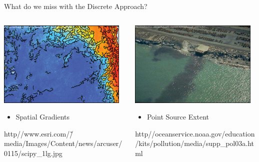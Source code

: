 \documentclass[compress,noflama,nosectionpages]{beamer}
\begin{document}
\begin{frame}{What do we miss with the Discrete Approach?}

	\begin{columns}
		\begin{column}[c]{6cm}
	  	\includegraphics[height=4.1cm,clip=true,trim = 0mm 0mm 0mm 0mm,keepaspectratio=true]{images/scipy_border.png}%
	  	\vspace{3pt}
	  	\begin{itemize}
	  		\item{Spatial Gradients}
	  	\end{itemize}
	  	\vspace{25pt}
	  	{\fontsize{3pt}{3pt}\selectfont http\://www.esri.com/\~/media/Images/Content/news/arcuser/0115/scipy\_1\-lg.jpg}\normalsize
		\end{column}
		\begin{column}[c]{6cm}
			\includegraphics[height=4.1cm,keepaspectratio=true]{images/pointsource_border.png}%
			\vspace{3pt}
			\begin{itemize}
	  		\item{Point Source Extent}
	  	\end{itemize}
	  	\vspace{25pt}
	  	{\fontsize{3pt}{3pt}\selectfont http\://oceanservice.noaa.gov/education/kits/pollution/media/supp\_pol03a.html}\normalsize
		\end{column}
	\end{columns}
     
\end{frame}
\end{document}
